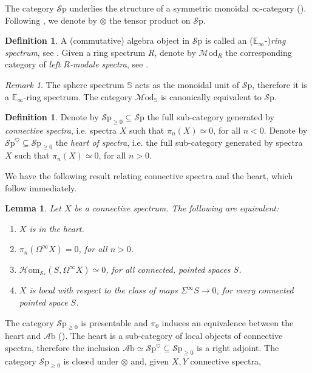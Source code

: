 \documentclass[a4paper]{book}
\newcommand{\lA}{\mathcal{A}}
\newcommand{\bE}{\mathbb{E}}
\newcommand{\lH}{\mathcal{H}}
\newcommand{\lM}{\mathcal{M}}
\newcommand{\lS}{\mathcal{S}}
\newcommand{\bS}{\mathbb{S}}
\newcommand{\Sp}{\lS\mathrm{p}} %
\newcommand{\Hom}{\lH\mathrm{om}} %
\newcommand{\Ab}{\lA\mathrm{b}} %
\newcommand{\Mod}{\lM\mathrm{od}} %
\newtheorem{lemma}[equation]{Lemma}
\theoremstyle{definition}
\newtheorem{definition}[equation]{Definition}
\theoremstyle{remark}
\newtheorem{remark}[equation]{Remark}
\numberwithin{equation}{section}
\begin{document}
  The category $\Sp$ underlies the structure of a symmetric monoidal $\infty$-category (\cite[Corollary 4.8.2.19]{lurie2017ha}). Following \cite{lurie2017ha}, we denote by $\otimes$ the tensor product on $\Sp$.
  \begin{definition}
    A (commutative) algebra object in $\Sp$ is called an ($\bE_\infty$-)\emph{ring spectrum}, see \cite[Definition 7.1.0.1]{lurie2017ha}. Given a ring spectrum $R$, denote by $\Mod_R$ the corresponding category of \emph{left $R$-module spectra}, see \cite[Definition 7.1.1.2]{lurie2017ha}. 
  \end{definition}
  \begin{remark}
    The sphere spectrum $\bS$ acts as the monoidal unit of $\Sp$, therefore it is a $\bE_\infty$-ring spectrum. The category $\Mod_{\bS}$ is canonically equivalent to $\Sp$. 
  \end{remark}
    \begin{definition}
    Denote by $\Sp_{\geq0}\subseteq\Sp$ the full sub-category generated by \emph{connective spectra}, i.e. spectra $X$ such that $\pi_n(X)\simeq0$, for all $n<0$. Denote by $\Sp^\heartsuit\subseteq\Sp_{\geq0}$ the \emph{heart of spectra}, i.e. the full sub-category generated by spectra $X$ such that $\pi_n(X)\simeq0$, for all $n>0$.
  \end{definition}
  We have the following result relating connective spectra and the heart, which follow immediately.
  \begin{lemma}
  Let $X$ be a connective spectrum. The following are equivalent:
  \begin{enumerate}
    \item $X$ is in the heart. 
    \item $\pi_n(\Omega^\infty X)=0$, for all $n>0$.
    \item $\Hom_{\lS_*}(S,\Omega^\infty X)\simeq0$, for all connected, pointed spaces $S$.
    \item $X$ is local with respect to the class of maps $\Sigma^\infty S\to0$, for every connected pointed space $S$.
  \end{enumerate}
  \end{lemma}

  The category $\Sp_{\geq0}$ is presentable and $\pi_0$ induces an equivalence between the heart and $\Ab$ (\cite[Proposition 1.4.3.6]{lurie2017ha}). The heart is a sub-category of local objects of connective spectra, therefore the inclusion $\Ab\simeq\Sp^\heartsuit\subseteq\Sp_{\geq0}$ is a right adjoint. The category $\Sp_{\geq0}$ is closed under $\otimes$ and, given $X,Y$ connective spectra, 
\end{document}
